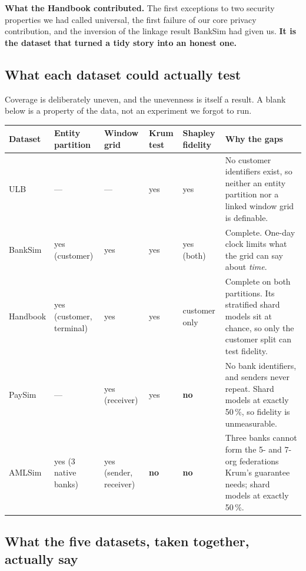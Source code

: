 \documentclass[11pt]{article}
\begin{document}
\textbf{What the Handbook contributed.} The first exceptions to two security properties we had called
universal, the first failure of our core privacy contribution, and the inversion of the linkage result
BankSim had given us. \textbf{It is the dataset that turned a tidy story into an honest one.}

\subsection{What each dataset could actually test}
\label{sec:coverage}

Coverage is deliberately uneven, and the unevenness is itself a result. A blank below is a property of the
data, not an experiment we forgot to run.

\begin{center}\small
\renewcommand{\arraystretch}{1.25}
\begin{tabularx}{\linewidth}{@{}>{\raggedright\arraybackslash}p{2.0cm} >{\raggedright\arraybackslash}p{1.5cm} >{\raggedright\arraybackslash}p{1.6cm} >{\raggedright\arraybackslash}p{1.5cm} >{\raggedright\arraybackslash}p{1.7cm} >{\raggedright\arraybackslash}X@{}}
\toprule
\textbf{Dataset} & \textbf{Entity partition} & \textbf{Window grid} & \textbf{Krum test} & \textbf{Shapley fidelity} & \textbf{Why the gaps} \\
\midrule
ULB & --- & --- & yes & yes & No customer identifiers exist, so neither an entity partition nor a linked window grid is definable. \\
BankSim & yes (customer) & yes & yes & yes (both) & Complete. One-day clock limits what the grid can say about \emph{time}. \\
Handbook & yes (customer, terminal) & yes & yes & customer only & Complete on both partitions. Its stratified shard models sit at chance, so only the customer split can test fidelity. \\
PaySim & --- & yes (receiver) & yes & \textbf{no} & No bank identifiers, and senders never repeat. Shard models at exactly 50\,\%, so fidelity is unmeasurable. \\
AMLSim & yes (3 native banks) & yes (sender, receiver) & \textbf{no} & \textbf{no} & Three banks cannot form the 5- and 7-org federations Krum's guarantee needs; shard models at exactly 50\,\%. \\
\bottomrule
\end{tabularx}
\end{center}

\subsection{What the five datasets, taken together, actually say}
\end{document}

